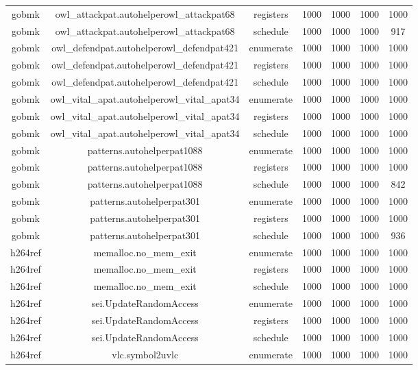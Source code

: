 \begin{center}
\begin{longtable}{c|c|c|c|c|c|c}
		gobmk & owl\_attackpat.autohelperowl\_attackpat68 & registers & 1000 & 1000 & 1000 & 1000 \\
		gobmk & owl\_attackpat.autohelperowl\_attackpat68 & schedule & 1000 & 1000 & 1000 & 917 \\
		\hline
		gobmk & owl\_defendpat.autohelperowl\_defendpat421 & enumerate & 1000 & 1000 & 1000 & 1000 \\
		gobmk & owl\_defendpat.autohelperowl\_defendpat421 & registers & 1000 & 1000 & 1000 & 1000 \\
		gobmk & owl\_defendpat.autohelperowl\_defendpat421 & schedule & 1000 & 1000 & 1000 & 1000 \\
		\hline
		gobmk & owl\_vital\_apat.autohelperowl\_vital\_apat34 & enumerate & 1000 & 1000 & 1000 & 1000 \\
		gobmk & owl\_vital\_apat.autohelperowl\_vital\_apat34 & registers & 1000 & 1000 & 1000 & 1000 \\
		gobmk & owl\_vital\_apat.autohelperowl\_vital\_apat34 & schedule & 1000 & 1000 & 1000 & 1000 \\
		\hline
		gobmk & patterns.autohelperpat1088 & enumerate & 1000 & 1000 & 1000 & 1000 \\
		gobmk & patterns.autohelperpat1088 & registers & 1000 & 1000 & 1000 & 1000 \\
		gobmk & patterns.autohelperpat1088 & schedule & 1000 & 1000 & 1000 & 842 \\
		\hline
		gobmk & patterns.autohelperpat301 & enumerate & 1000 & 1000 & 1000 & 1000 \\
		gobmk & patterns.autohelperpat301 & registers & 1000 & 1000 & 1000 & 1000 \\
		gobmk & patterns.autohelperpat301 & schedule & 1000 & 1000 & 1000 & 936 \\
		\hline
		h264ref & memalloc.no\_mem\_exit & enumerate & 1000 & 1000 & 1000 & 1000 \\
		h264ref & memalloc.no\_mem\_exit & registers & 1000 & 1000 & 1000 & 1000 \\
		h264ref & memalloc.no\_mem\_exit & schedule & 1000 & 1000 & 1000 & 1000 \\
		\hline
		h264ref & sei.UpdateRandomAccess & enumerate & 1000 & 1000 & 1000 & 1000 \\
		h264ref & sei.UpdateRandomAccess & registers & 1000 & 1000 & 1000 & 1000 \\
		h264ref & sei.UpdateRandomAccess & schedule & 1000 & 1000 & 1000 & 1000 \\
		\hline
		h264ref & vlc.symbol2uvlc & enumerate & 1000 & 1000 & 1000 & 1000 \\

\end{longtable}
\end{center}

